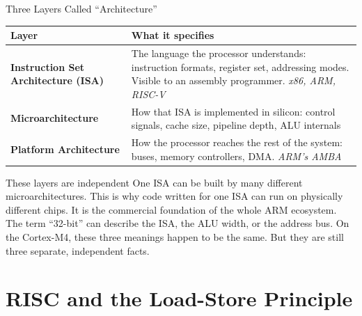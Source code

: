 \documentclass[9pt,aspectratio=169,xcolor=table]{beamer}
\newcommand{\striped}{\rowcolors{1}{white}{stripe}}
\begin{document}
\begin{frame}{Three Layers Called ``Architecture''}
    \leavevmode
    \begin{center}
    {\small
    \striped
    \begin{tabular}{@{}l R{.58\textwidth}@{}}
        \toprule
        \textbf{Layer} & \textbf{What it specifies} \\
        \midrule
        \textbf{Instruction Set Architecture (ISA)}
            & The language the processor understands: instruction formats,
              register set, addressing modes. Visible to an assembly programmer.
              \emph{x86, ARM, RISC-V} \\[2mm]
        \textbf{Microarchitecture}
            & How that ISA is implemented in silicon: control signals, cache
              size, pipeline depth, ALU internals \\[2mm]
        \textbf{Platform Architecture}
            & How the processor reaches the rest of the system: buses, memory controllers,
              DMA. \emph{ARM's AMBA} \\
        \bottomrule
    \end{tabular}}
    \end{center}
    \vspace{2mm}
    \begin{block}{These layers are independent}
        One ISA can be built by many different microarchitectures. This is why code written for one ISA can run on physically different chips. It is the commercial foundation of the whole ARM ecosystem.
        \vspace{1mm}
        The term ``32-bit'' can describe the ISA, the ALU width, or the address bus. On the Cortex-M4, these three meanings happen to be the same. But they are still three separate, independent facts.
    \end{block}
\end{frame}

\section{RISC and the Load-Store Principle}
\end{document}
